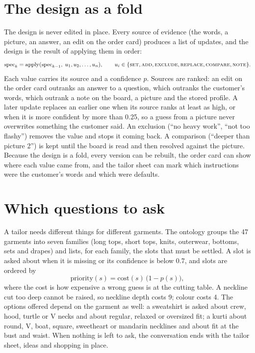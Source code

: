 \section{The design as a fold}
The design is never edited in place. Every source of evidence (the words, a picture, an answer, an edit on the order card) produces a list of updates, and the design is the result of applying them in order:
\[
\mathrm{spec}_k = \mathrm{apply}(\mathrm{spec}_{k-1},\; u_1, u_2, \dots, u_n), \qquad u_i \in \{\textsc{set}, \textsc{add}, \textsc{exclude}, \textsc{replace}, \textsc{compare}, \textsc{note}\}.
\]
Each value carries its source and a confidence $p$. Sources are ranked: an edit on the order card outranks an answer to a question, which outranks the customer's words, which outrank a note on the board, a picture and the stored profile. A later update replaces an earlier one when its source ranks at least as high, or when it is more confident by more than 0.25, so a guess from a picture never overwrites something the customer said. An exclusion (``no heavy work'', ``not too flashy'') removes the value and stops it coming back. A comparison (``deeper than picture 2'') is kept until the board is read and then resolved against the picture. Because the design is a fold, every version can be rebuilt, the order card can show where each value came from, and the tailor sheet can mark which instructions were the customer's words and which were defaults.

\section{Which questions to ask}
A tailor needs different things for different garments. The ontology groups the 47 garments into seven families (long tops, short tops, knits, outerwear, bottoms, sets and drapes) and lists, for each family, the slots that must be settled. A slot is asked about when it is missing or its confidence is below 0.7, and slots are ordered by
\[
\mathrm{priority}(s) = \mathrm{cost}(s)\,\bigl(1 - p(s)\bigr),
\]
where the cost is how expensive a wrong guess is at the cutting table. A neckline cut too deep cannot be raised, so neckline depth costs 9; colour costs 4. The options offered depend on the garment as well: a sweatshirt is asked about crew, hood, turtle or V necks and about regular, relaxed or oversized fit; a kurti about round, V, boat, square, sweetheart or mandarin necklines and about fit at the bust and waist. When nothing is left to ask, the conversation ends with the tailor sheet, ideas and shopping in place.
